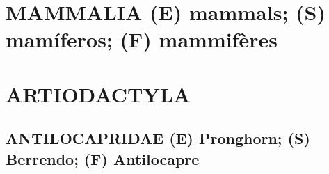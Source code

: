 \rmfamily
{}


\section*{MAMMALIA (E) mammals; (S) mamíferos; (F) mammifères}

\section*{ARTIODACTYLA}

\subsection*{ANTILOCAPRIDAE (E) Pronghorn; (S) Berrendo; (F) Antilocapre}


